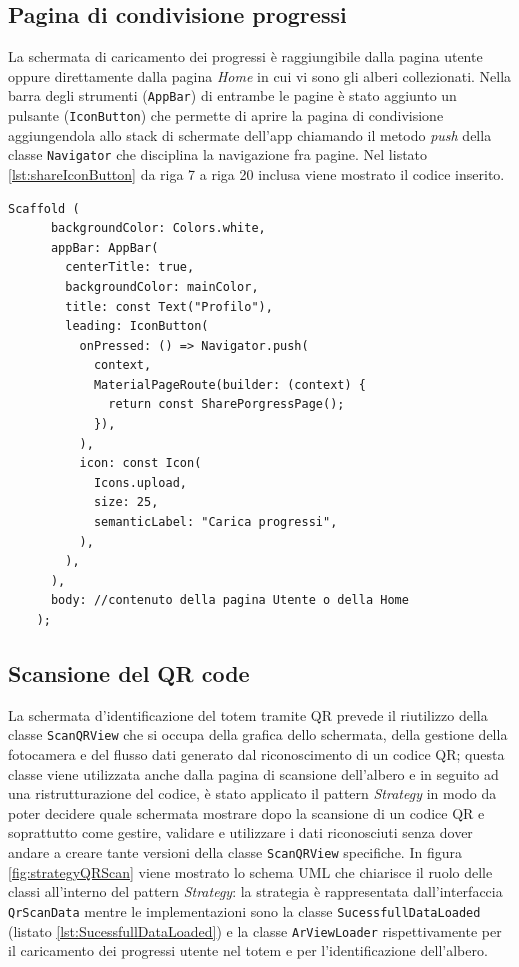 \subsection{Pagina di condivisione progressi}
La schermata di caricamento dei progressi è raggiungibile dalla pagina utente oppure direttamente dalla pagina \textit{Home} in cui vi sono gli alberi collezionati. Nella barra degli strumenti (\texttt{AppBar}) di entrambe le pagine è stato aggiunto un pulsante (\texttt{IconButton}) che permette di aprire la pagina di condivisione aggiungendola allo stack di schermate dell'app chiamando il metodo \textit{push} della classe \texttt{Navigator} che disciplina la navigazione fra pagine. Nel listato \ref{lst:shareIconButton} da riga 7 a riga 20 inclusa viene mostrato il codice inserito.

\begin{lstlisting}[style=FlutterStyle, caption={Codice aggiornato della barra degli strumenti dell'app: inserito pulsante per la condivisione dei progressi.}, label={lst:shareIconButton}]
    Scaffold (
      backgroundColor: Colors.white,
      appBar: AppBar(
        centerTitle: true,
        backgroundColor: mainColor, 
        title: const Text("Profilo"),
        leading: IconButton(
          onPressed: () => Navigator.push(
            context,
            MaterialPageRoute(builder: (context) {
              return const SharePorgressPage();
            }),
          ),
          icon: const Icon(
            Icons.upload,
            size: 25,
            semanticLabel: "Carica progressi",
          ),
        ),
      ),
      body: //contenuto della pagina Utente o della Home
    );
\end{lstlisting}

\subsection{Scansione del QR code}
La schermata d'identificazione del totem tramite QR prevede il riutilizzo della classe \texttt{ScanQRView} che si occupa della grafica dello schermata, della gestione della fotocamera e del flusso dati generato dal riconoscimento di un codice QR; questa classe viene utilizzata anche dalla pagina di scansione dell'albero e in seguito ad una ristrutturazione del codice, è stato applicato il pattern \textit{Strategy} in modo da poter decidere quale schermata mostrare dopo la scansione di un codice QR e soprattutto come gestire, validare e utilizzare i dati riconosciuti senza dover andare a creare tante versioni della classe \texttt{ScanQRView} specifiche. In figura \ref{fig:strategyQRScan} viene mostrato lo schema UML che chiarisce il ruolo delle classi all'interno del pattern \textit{Strategy}: la strategia è rappresentata dall'interfaccia \texttt{QrScanData} mentre le implementazioni sono la classe \texttt{SucessfullDataLoaded} (listato \ref{lst:SucessfullDataLoaded}) e la classe \texttt{ArViewLoader} rispettivamente per il caricamento dei progressi utente nel totem e per l'identificazione dell'albero.

